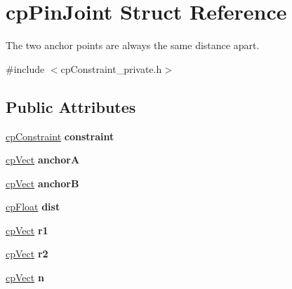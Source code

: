 \hypertarget{structcp_pin_joint}{}\section{cp\+Pin\+Joint Struct Reference}
\label{structcp_pin_joint}


The two anchor points are always the same distance apart.  




{\ttfamily \#include $<$cp\+Constraint\+\_\+private.\+h$>$}

\subsection*{Public Attributes}
\begin{DoxyCompactItemize}
\item 
\hypertarget{structcp_pin_joint_a22271b24382dc0f3c3252b920f5ea2b0}{}\hyperlink{structcp_constraint}{cp\+Constraint} {\bfseries constraint}\label{structcp_pin_joint_a22271b24382dc0f3c3252b920f5ea2b0}

\item 
\hypertarget{structcp_pin_joint_a8323f431e3a4ff0d9267ed909dada92f}{}\hyperlink{structcp_vect}{cp\+Vect} {\bfseries anchor\+A}\label{structcp_pin_joint_a8323f431e3a4ff0d9267ed909dada92f}

\item 
\hypertarget{structcp_pin_joint_a11e90db9a11f6dd63d49639f87ff93cd}{}\hyperlink{structcp_vect}{cp\+Vect} {\bfseries anchor\+B}\label{structcp_pin_joint_a11e90db9a11f6dd63d49639f87ff93cd}

\item 
\hypertarget{structcp_pin_joint_a045d7f0e20e7cb35121063026712cdf0}{}\hyperlink{group__basic_types_gac1ed65573e035bf892505768c852d8d3}{cp\+Float} {\bfseries dist}\label{structcp_pin_joint_a045d7f0e20e7cb35121063026712cdf0}

\item 
\hypertarget{structcp_pin_joint_a5cd074b422532afc76c1d2b47e755543}{}\hyperlink{structcp_vect}{cp\+Vect} {\bfseries r1}\label{structcp_pin_joint_a5cd074b422532afc76c1d2b47e755543}

\item 
\hypertarget{structcp_pin_joint_a82dbd85f7f012228dd51c1c6b9b5b661}{}\hyperlink{structcp_vect}{cp\+Vect} {\bfseries r2}\label{structcp_pin_joint_a82dbd85f7f012228dd51c1c6b9b5b661}

\item 
\hypertarget{structcp_pin_joint_a7bc2a4109fa4ec19e857bc7eff57701a}{}\hyperlink{structcp_vect}{cp\+Vect} {\bfseries n}\label{structcp_pin_joint_a7bc2a4109fa4ec19e857bc7eff57701a}


\end{DoxyCompactItemize}
